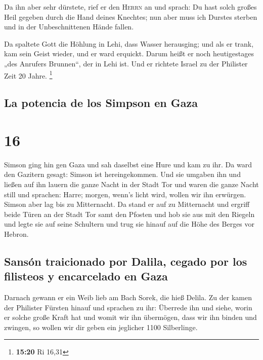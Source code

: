  Da ihn aber sehr dürstete, rief er den \textsc{Herrn} an
und sprach: Du hast solch großes Heil gegeben durch die Hand deines
Knechtes; nun aber muss ich Durstes sterben und in der Unbeschnittenen
Hände fallen.

 Da spaltete Gott die Höhlung in Lehi, dass Wasser
herausging; und als er trank, kam sein Geist wieder, und er ward
erquickt. Darum heißt er noch heutigestages „des Anrufers Brunnen``, der
in Lehi ist.  Und er richtete Israel zu der Philister
Zeit 20 Jahre. \footnote{\textbf{15:20} Ri 16,31}

\hypertarget{la-potencia-de-los-simpson-en-gaza}{%
\subsection{La potencia de los Simpson en
Gaza}\label{la-potencia-de-los-simpson-en-gaza}}

\hypertarget{section-15}{%
\section{16}\label{section-15}}

 Simson ging hin gen Gaza und sah daselbst eine Hure und
kam zu ihr.  Da ward den Gazitern gesagt: Simson ist
hereingekommen. Und sie umgaben ihn und ließen auf ihn lauern die ganze
Nacht in der Stadt Tor und waren die ganze Nacht still und sprachen:
Harre; morgen, wenn's licht wird, wollen wir ihn erwürgen.
 Simson aber lag bis zu Mitternacht. Da stand er auf zu
Mitternacht und ergriff beide Türen an der Stadt Tor samt den Pfosten
und hob sie aus mit den Riegeln und legte sie auf seine Schultern und
trug sie hinauf auf die Höhe des Berges vor Hebron.

\hypertarget{sansuxf3n-traicionado-por-dalila-cegado-por-los-filisteos-y-encarcelado-en-gaza}{%
\subsection{Sansón traicionado por Dalila, cegado por los filisteos y
encarcelado en
Gaza}\label{sansuxf3n-traicionado-por-dalila-cegado-por-los-filisteos-y-encarcelado-en-gaza}}

 Darnach gewann er ein Weib lieb am Bach Sorek, die hieß
Delila.  Zu der kamen der Philister Fürsten hinauf und
sprachen zu ihr: Überrede ihn und siehe, worin er solche große Kraft hat
und womit wir ihn übermögen, dass wir ihn binden und zwingen, so wollen
wir dir geben ein jeglicher 1100 Silberlinge.

